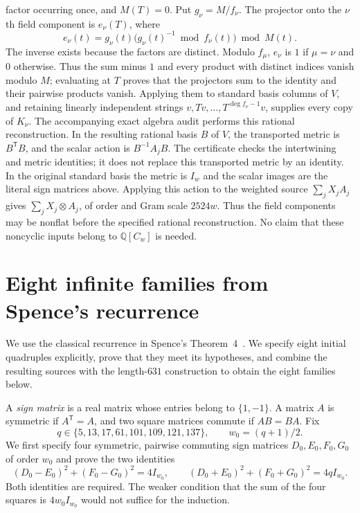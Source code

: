 \documentclass[10pt]{article}
\newcommand{\Q}{\mathbb Q}
\begin{document}
factor occurring once, and $M(T)=0$. Put $g_\nu=M/f_\nu$. The projector onto the
$\nu$th field component is $e_\nu(T)$, where
\[
 e_\nu(t)=g_\nu(t)\bigl(g_\nu(t)^{-1}\bmod f_\nu(t)\bigr)\bmod M(t).
\]
The inverse exists because the factors are distinct. Modulo $f_\mu$,
$e_\nu$ is $1$ if $\mu=\nu$ and $0$ otherwise. Thus the sum minus $1$
and every product with distinct indices vanish modulo $M$; evaluating at
$T$ proves that the projectors sum to the identity and their pairwise
products vanish. Applying them to
standard basis columns of $V$, and retaining linearly independent strings
$v,Tv,\ldots,T^{\deg f_\nu-1}v$, supplies every copy of $K_\nu$.
The accompanying exact algebra audit performs this rational reconstruction.
In the resulting rational basis $B$ of $V$, the
transported metric is $B^{\mathsf T}B$, and the scalar action is
$B^{-1}A_jB$. The certificate checks the intertwining and metric
identities; it does not replace this transported metric by an identity.
In the original standard basis the metric is $I_w$ and the scalar images
are the literal sign matrices above. Applying this action to the weighted
source $\sum_jX_jA_j$ gives $\sum_jX_j\otimes A_j$, of order and Gram
scale $2524w$. Thus the field components may be nonflat before the
specified rational reconstruction. No claim that these noncyclic inputs
belong to $\Q[C_w]$ is needed.

\section{Eight infinite families from Spence's recurrence}\label{sec:spence-rigorous}

We use the classical recurrence in Spence's Theorem~4~\cite{spence}.
We specify eight initial quadruples explicitly, prove that they meet its
hypotheses, and combine the resulting sources with the length-$631$
construction to obtain the eight families below.

A \emph{sign matrix} is a real matrix whose entries belong to $\{1,-1\}$.
A matrix $A$ is symmetric if $A^{\mathsf T}=A$, and two square matrices
commute if $AB=BA$. Fix
\[
 q\in\{5,13,17,61,101,109,121,137\},\qquad w_0=(q+1)/2.
\]
We first specify four symmetric, pairwise commuting sign matrices
$D_0,E_0,F_0,G_0$ of order $w_0$ and prove the two identities
\begin{equation}\label{eq:spence-starter-strong}
 (D_0-E_0)^2+(F_0-G_0)^2=4I_{w_0},\qquad
 (D_0+E_0)^2+(F_0+G_0)^2=4qI_{w_0}.
\end{equation}
Both identities are required. The weaker condition that the sum of the
four squares is $4w_0I_{w_0}$ would not suffice for the induction.
\end{document}
